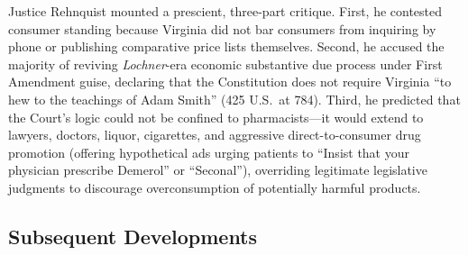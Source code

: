 \documentclass[12pt]{article}
\begin{document}
Justice Rehnquist mounted a prescient, three-part critique. First, he contested consumer standing because Virginia did not bar consumers from inquiring by phone or publishing comparative price lists themselves. Second, he accused the majority of reviving \textit{Lochner}-era economic substantive due process under First Amendment guise, declaring that the Constitution does not require Virginia ``to hew to the teachings of Adam Smith'' (425 U.S.\ at 784). Third, he predicted that the Court's logic could not be confined to pharmacists---it would extend to lawyers, doctors, liquor, cigarettes, and aggressive direct-to-consumer drug promotion (offering hypothetical ads urging patients to ``Insist that your physician prescribe Demerol'' or ``Seconal''), overriding legitimate legislative judgments to discourage overconsumption of potentially harmful products.

\subsection{Subsequent Developments}
\end{document}

